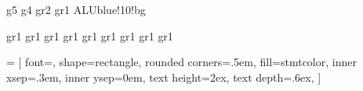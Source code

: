 		{g5}
			{g4}
			{gr2}
		{gr1}
		{ALUblue!10!bg}


			{gr1}
		{gr1}
		{gr1} 
				{gr1}
				{gr1}
			{gr1}
			{gr1}
		{gr1}
			{gr1}




 = [%
font=\ttfamily,%
shape=rectangle,%
rounded corners=.5em,%
fill=stmtcolor,%
inner xsep=.3em,%
inner ysep=0em, %
text height=2ex, %
text depth=.6ex,
]


\newcommand{\tikzstmt}[3]{{%
		\tikz[baseline]{%
			\node[st,fill=#2] at (0,.64ex){%
				\hspace{.3em}\texttt{\strut#3#1}\hspace{.3em}\strut};}
}}

\newcommand{\stcol}[2]{\tikzstmt{#1}{#2}{}}
\newcommand{\stsmcol}[2]{\tikzstmt{#1}{#2}{\small}}
\newcommand{\stfootcol}[2]{\tikzstmt{#1}{#2}{\footnotesize}}

\newcommand{\stnorm}[1]{\stcol{#1}{stmtcolor}}
\newcommand{\stsm}[1]{\stsmcol{#1}{stmtcolor}}
\newcommand{\stfoot}[1]{\stfootcol{#1}{stmtcolor}}

\newcommand{\st}[1]{\stfoot{#1}}
\newcommand{\lab}[1]{\stfoot{\ensuremath{#1}}}
\newcommand{\lan}[1]{\stnorm{\ensuremath{#1}}}
\newcommand{\stn}[1]{\stnorm{#1}}

\newcommand{\formula}[2]{\tikz[baseline]{\node[shape=rectangle,line width=1pt,draw=#2,fill=#2!30,inner sep=1pt, align=center] at (0,.64ex){\hspace{.2em}\texttt{\strut#1}\hspace{.1em}\strut};}}
\newcommand{\itp}[1]{\formula{\ensuremath{#1}}{itp}}

\newcommand{\loc}[1]{\ensuremath{\ell_{#1}}\xspace}
\newcommand{\tf}{\ensuremath{\varphi}}
\newcommand{\ctf}{\ensuremath{\widehat{\varphi}}}
\newcommand{\invars}{\ensuremath{In}}
\newcommand{\outvars}{\ensuremath{Out}}
\newcommand{\auxvars}{\ensuremath{Aux}}

\newcommand{\Var}{\ensuremath{\mathit{Var}}}
\newcommand{\stmt}{\ensuremath{\mathit{Stmt}}}
\newcommand{\Loc}{\ensuremath{\mathit{Loc}}}
\newcommand{\err}{\ensuremath{\mathit{err}}}
\newcommand{\init}{\ensuremath{\mathit{init}}}

